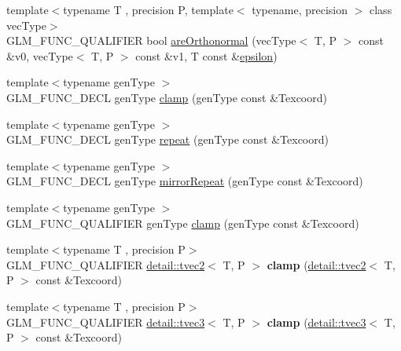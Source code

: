 \begin{DoxyCompactItemize}
\item 
{\footnotesize template$<$typename T , precision P, template$<$ typename, precision $>$ class vec\+Type$>$ }\\G\+L\+M\+\_\+\+F\+U\+N\+C\+\_\+\+Q\+U\+A\+L\+I\+F\+I\+ER bool \hyperlink{group__gtx__vector__query_ga89c82bc60e5b84e4489b74c15a134caf}{are\+Orthonormal} (vec\+Type$<$ T, P $>$ const \&v0, vec\+Type$<$ T, P $>$ const \&v1, T const \&\hyperlink{group__gtc__constants_gacb41049b8d22c8aa90e362b96c524feb}{epsilon})
\item 
{\footnotesize template$<$typename gen\+Type $>$ }\\G\+L\+M\+\_\+\+F\+U\+N\+C\+\_\+\+D\+E\+CL gen\+Type \hyperlink{group__gtx__wrap_ga6c0cc6bd1d67ea1008d2592e998bad33}{clamp} (gen\+Type const \&Texcoord)
\item 
{\footnotesize template$<$typename gen\+Type $>$ }\\G\+L\+M\+\_\+\+F\+U\+N\+C\+\_\+\+D\+E\+CL gen\+Type \hyperlink{group__gtx__wrap_ga809650c6310ea7c42666e918c117fb6f}{repeat} (gen\+Type const \&Texcoord)
\item 
{\footnotesize template$<$typename gen\+Type $>$ }\\G\+L\+M\+\_\+\+F\+U\+N\+C\+\_\+\+D\+E\+CL gen\+Type \hyperlink{group__gtx__wrap_ga16a89b0661b60d5bea85137bbae74d73}{mirror\+Repeat} (gen\+Type const \&Texcoord)
\item 
{\footnotesize template$<$typename gen\+Type $>$ }\\G\+L\+M\+\_\+\+F\+U\+N\+C\+\_\+\+Q\+U\+A\+L\+I\+F\+I\+ER gen\+Type \hyperlink{group__gtx__wrap_ga6c0cc6bd1d67ea1008d2592e998bad33}{clamp} (gen\+Type const \&Texcoord)
\item 
{\footnotesize template$<$typename T , precision P$>$ }\\G\+L\+M\+\_\+\+F\+U\+N\+C\+\_\+\+Q\+U\+A\+L\+I\+F\+I\+ER \hyperlink{structglm_1_1detail_1_1tvec2}{detail\+::tvec2}$<$ T, P $>$ {\bfseries clamp} (\hyperlink{structglm_1_1detail_1_1tvec2}{detail\+::tvec2}$<$ T, P $>$ const \&Texcoord)\hypertarget{namespaceglm_ac07453cc5dd0ddf29280decfd676e7a1}{}\label{namespaceglm_ac07453cc5dd0ddf29280decfd676e7a1}

\item 
{\footnotesize template$<$typename T , precision P$>$ }\\G\+L\+M\+\_\+\+F\+U\+N\+C\+\_\+\+Q\+U\+A\+L\+I\+F\+I\+ER \hyperlink{structglm_1_1detail_1_1tvec3}{detail\+::tvec3}$<$ T, P $>$ {\bfseries clamp} (\hyperlink{structglm_1_1detail_1_1tvec3}{detail\+::tvec3}$<$ T, P $>$ const \&Texcoord)\hypertarget{namespaceglm_a378e165eb674a1767e7532381503c45a}{}\label{namespaceglm_a378e165eb674a1767e7532381503c45a}


\end{DoxyCompactItemize}
